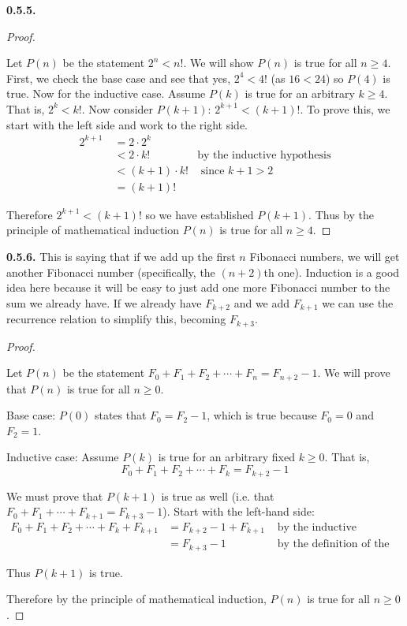 \documentclass[10pt,]{book}
\theoremstyle{plain}
\theoremstyle{definition}
\theoremstyle{definition}
\theoremstyle{definition}
\theoremstyle{definition}
\numberwithin{equation}{chapter}
\newcommand{\lt}{<}
\newcommand{\gt}{>}
\newcommand{\amp}{&}
\begin{document}
\noindent\textbf{0.5.5.} \begin{proof}\hypertarget{proof-9}{}
\hypertarget{p-445}{}%
Let \(P(n)\) be the statement \(2^n \lt  n!\). We will show \(P(n)\) is true for all \(n \ge 4\). First, we check the base case and see that yes, \(2^4 \lt  4!\) (as \(16 \lt  24\)) so \(P(4)\) is true. Now for the inductive case. Assume \(P(k)\) is true for an arbitrary \(k \ge 4\). That is, \(2^k \lt  k!\). Now consider \(P(k+1)\): \(2^{k+1} \lt  (k+1)!\). To prove this, we start with the left side and work to the right side.%
\begin{align*}
2^{k+1}~ \amp = 2\cdot 2^k \amp\\
\amp \lt 2\cdot k! \amp \text{by the inductive hypothesis}\\
\amp \lt (k+1) \cdot k! \amp \text{ since } k+1 \gt 2\\
\amp = (k+1)! \amp
\end{align*}
%
\par
\hypertarget{p-446}{}%
Therefore \(2^{k+1} \lt  (k+1)!\) so we have established \(P(k+1)\). Thus by the principle of mathematical induction \(P(n)\) is true for all \(n \ge 4\).%
\end{proof}
\par\smallskip
\noindent\textbf{0.5.6.} \hypertarget{p-448}{}%
This is saying that if we add up the first \(n\) Fibonacci numbers, we will get another Fibonacci number (specifically, the \((n+2)\)th one). Induction is a good idea here because it will be easy to just add one more Fibonacci number to the sum we already have. If we already have \(F_{k+2}\) and we add \(F_{k+1}\) we can use the recurrence relation to simplify this, becoming \(F_{k+3}\).%
\begin{proof}\hypertarget{proof-10}{}
\hypertarget{p-449}{}%
Let \(P(n)\) be the statement \(F_0 + F_1 + F_2 + \cdots + F_n = F_{n+2} - 1\). We will prove that \(P(n)\) is true for all \(n \ge 0\).%
\par
\hypertarget{p-450}{}%
Base case: \(P(0)\) states that \(F_0 = F_2 - 1\), which is true because \(F_0 = 0\) and \(F_2 = 1\).%
\par
\hypertarget{p-451}{}%
Inductive case: Assume \(P(k)\) is true for an arbitrary fixed \(k \ge 0\). That is,%
\begin{equation*}
F_0 + F_1 + F_2 + \cdots + F_k = F_{k+2} - 1
\end{equation*}
%
\par
\hypertarget{p-452}{}%
We must prove that \(P(k+1)\) is true as well (i.e. that \(F_0 + F_1 + \cdots +F_{k+1} = F_{k+3} - 1\)). Start with the left-hand side:%
\begin{align*}
F_0 + F_1 + F_2 + \cdots + F_k + F_{k+1} \amp = F_{k+2} - 1 + F_{k+1} \amp \mbox{ by the inductive hypothesis}\\
\amp = F_{k+3} - 1 \amp \mbox{ by the definition of the Fibonacci numbers}
\end{align*}
%
\par
\hypertarget{p-453}{}%
Thus \(P(k+1)\) is true.%
\par
\hypertarget{p-454}{}%
Therefore by the principle of mathematical induction, \(P(n)\) is true for all \(n \ge 0\).%
\end{proof}
\end{document}
